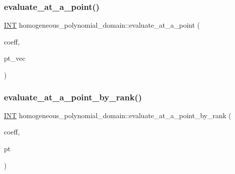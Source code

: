 \subsubsection{\texorpdfstring{evaluate\+\_\+at\+\_\+a\+\_\+point()}{evaluate\_at\_a\_point()}}
{\footnotesize\ttfamily \mbox{\hyperlink{galois_8h_a09fddde158a3a20bd2dcadb609de11dc}{I\+NT}} homogeneous\+\_\+polynomial\+\_\+domain\+::evaluate\+\_\+at\+\_\+a\+\_\+point (\begin{DoxyParamCaption}\item[{\mbox{\hyperlink{galois_8h_a09fddde158a3a20bd2dcadb609de11dc}{I\+NT}} $\ast$}]{coeff,  }\item[{\mbox{\hyperlink{galois_8h_a09fddde158a3a20bd2dcadb609de11dc}{I\+NT}} $\ast$}]{pt\+\_\+vec }\end{DoxyParamCaption})}

\mbox{\label{classhomogeneous__polynomial__domain_ae0bde037e3b48c69c7bd2b719eee5489}} 
\subsubsection{\texorpdfstring{evaluate\+\_\+at\+\_\+a\+\_\+point\+\_\+by\+\_\+rank()}{evaluate\_at\_a\_point\_by\_rank()}}
{\footnotesize\ttfamily \mbox{\hyperlink{galois_8h_a09fddde158a3a20bd2dcadb609de11dc}{I\+NT}} homogeneous\+\_\+polynomial\+\_\+domain\+::evaluate\+\_\+at\+\_\+a\+\_\+point\+\_\+by\+\_\+rank (\begin{DoxyParamCaption}\item[{\mbox{\hyperlink{galois_8h_a09fddde158a3a20bd2dcadb609de11dc}{I\+NT}} $\ast$}]{coeff,  }\item[{\mbox{\hyperlink{galois_8h_a09fddde158a3a20bd2dcadb609de11dc}{I\+NT}}}]{pt }\end{DoxyParamCaption})}

\mbox{\label{classhomogeneous__polynomial__domain_a9b1f3d170e1c7ad782a719fabcd9c6f0}} 
